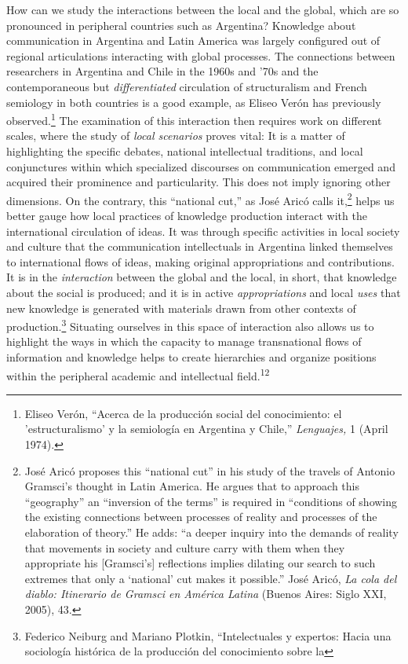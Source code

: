 \documentclass{tufte-handout}
\begin{document}
How can we study the interactions between the local and the global,
which are so pronounced in peripheral countries such as Argentina?
Knowledge about communication in Argentina and Latin America was largely
configured out of regional articulations interacting with global
processes. The connections between researchers in Argentina and Chile in
the 1960s and '70s and the contemporaneous but \emph{differentiated}
circulation of structuralism and French semiology in both countries is a
good example, as Eliseo Verón has previously observed.\footnote{Eliseo
  Verón, ``Acerca de la producción social del conocimiento: el
  'estructuralismo' y la semiología en Argentina y Chile,''
  \emph{Lenguajes,} 1 (April 1974).} The examination of this interaction
then requires work on different scales, where the study of \emph{local
scenarios} proves vital: It is a matter of highlighting the specific
debates, national intellectual traditions, and local conjunctures within
which specialized discourses on communication emerged and acquired their
prominence and particularity. This does not imply ignoring other
dimensions. On the contrary, this ``national cut,'' as José Aricó calls
it,\footnote{José Aricó proposes this ``national cut'' in his study of
  the travels of Antonio Gramsci's thought in Latin America. He argues
  that to approach this ``geography'' an ``inversion of the terms'' is
  required in ``conditions of showing the existing connections between
  processes of reality and processes of the elaboration of theory.'' He
  adds: ``a deeper inquiry into the demands of reality that movements in
  society and culture carry with them when they appropriate his
  {[}Gramsci's{]} reflections implies dilating our search to such
  extremes that only a `national' cut makes it possible.'' José Aricó,
  \emph{La cola del diablo: Itinerario de Gramsci en América Latina}
  (Buenos Aires: Siglo XXI, 2005), 43.} helps us better gauge how local
practices of knowledge production interact with the international
circulation of ideas. It was through specific activities in local
society and culture that the communication intellectuals in Argentina
linked themselves to international flows of ideas, making original
appropriations and contributions. It is in the \emph{interaction}
between the global and the local, in short, that knowledge about the
social is produced; and it is in active \emph{appropriations} and local
\emph{uses} that new knowledge is generated with materials drawn from
other contexts of production.\footnote{Federico Neiburg and Mariano
  Plotkin, ``Intelectuales y expertos: Hacia una sociología histórica de
  la producción del conocimiento sobre la} Situating ourselves in this space of
interaction also allows us to highlight the ways in which the capacity
to manage transnational flows of information and knowledge helps to
create hierarchies and organize positions within the peripheral academic
and intellectual field.\textsuperscript{12}
\end{document}
